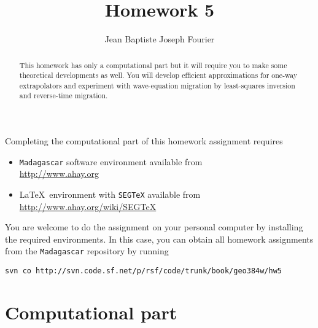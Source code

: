 \author{Jean Baptiste Joseph Fourier} 
\title{Homework 5}

\begin{abstract}
  This homework has only a computational part but it will require you
  to make some theoretical developments as well.  You will develop
  efficient approximations for one-way extrapolators and
  experiment with wave-equation migration by least-squares inversion
  and reverse-time migration.
\end{abstract}

Completing the computational part of this homework assignment requires
\begin{itemize}
\item \texttt{Madagascar} software environment available from \\
  \url{http://www.ahay.org}
\item \LaTeX\ environment with \texttt{SEGTeX} available from \\ 
  \url{http://www.ahay.org/wiki/SEGTeX}
\end{itemize}

You are welcome to do the assignment on your personal computer by
installing the required environments. In this case, you can obtain all
homework assignments from the \texttt{Madagascar} repository by running
\begin{verbatim}
svn co http://svn.code.sf.net/p/rsf/code/trunk/book/geo384w/hw5
\end{verbatim}

\section{Computational part}

